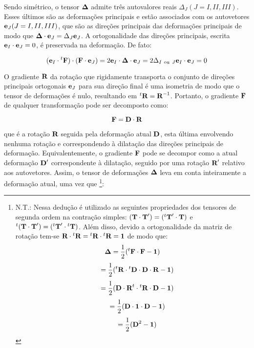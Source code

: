 \documentclass[
	11pt, %
	fleqn, %
	a4paper, %
]{LegrandOrangeBook}
\begin{document}
Sendo simétrico, o tensor $\bm{\Delta}$ admite três autovalores reais $\Delta_J (J=I,II,III)$. Esses últimos são as deformações principais e estão associados com os autovetores $\textbf{e}_J (J=I,II,III)$, que são as direções principais das deformações principais de modo que $\bm{\Delta} \cdot \textbf{e}_J = \Delta_J \textbf{e}_J$. A ortogonalidade das direções principais, escrita $\textbf{e}_I \cdot \textbf{e}_J = 0$, é preservada na deformação. De fato:

\begin{equation}
	\label{eq:eIFFeJ}	
	(\textbf{e}_I \cdot {}^t \textbf{F}) \cdot (\textbf{F} \cdot \textbf{e}_J) = 2\textbf{e}_I \cdot \bm{\Delta} \cdot \textbf{e}_J = 2 \Delta_{I~\text{ou}~J} \textbf{e}_I \cdot \textbf{e}_J = 0
\end{equation}

O gradiente $\textbf{R}$ da rotação que rigidamente transporta o conjunto de direções principais ortogonais $\textbf{e}_J$ para sua direção final é uma isometria de modo que o tensor de deformações é nulo, resultando em ${}^t\textbf{R} = \textbf{R}^{-1}$. Portanto, o gradiente $\textbf{F}$ de qualquer transformação pode ser decomposto como:

\begin{equation}
	\label{eq:F=DR}	
	\textbf{F} = \textbf{D} \cdot \textbf{R}
\end{equation}

que é a rotação $\textbf{R}$ seguida pela deformação atual $\textbf{D}$, esta última envolvendo nenhuma rotação e correspondendo à dilatação das direções principais de deformação. Equivalentemente, o gradiente $\textbf{F}$ pode se decompor como a atual deformação $\textbf{D}'$ correspondente à dilatação, seguido por uma rotação $\textbf{R}'$ relativo aos autovetores. Assim, o tensor de deformações $\bm{\Delta}$ leva em conta inteiramente a deformação atual, uma vez que \footnote{
N.T.: Nessa dedução é utilizado as seguintes propriedades dos tensores de segunda ordem na contração simples: $(\textbf{T} \cdot \textbf{T}') = ({}^t\textbf{T}' \cdot \textbf{T})$ e ${}^t(\textbf{T} \cdot \textbf{T}') =({}^t\textbf{T}' \cdot {}^t\textbf{T})$. Além disso, devido a ortogonalidade da matriz de rotação tem-se $\textbf{R} \cdot {}^t\textbf{R} = {}^t\textbf{R} \cdot {}^t\textbf{R} = \bm{1}$ de modo que:
\begin{displaymath}	
	\bm{\Delta} = \dfrac{1}{2}({}^t\textbf{F} \cdot \textbf{F} - \bm{1})
\end{displaymath}
\begin{displaymath}	
	~~~~ = \dfrac{1}{2}({}^t\textbf{R} \cdot {}^t\textbf{D} \cdot \textbf{D} \cdot \textbf{R} - \bm{1})
\end{displaymath}
\begin{displaymath}	
	~~~~ = \dfrac{1}{2}(\textbf{D} \cdot \textbf{R}^t \cdot {}^t\textbf{R} \cdot \textbf{D} - \bm{1})
\end{displaymath}
\begin{displaymath}	
	~~~~ = \dfrac{1}{2}(\textbf{D} \cdot \bm{1} \cdot \textbf{D} - \bm{1})
\end{displaymath}
\begin{displaymath}	
	~~~~ = \dfrac{1}{2}(\textbf{D}^2- \bm{1})
\end{displaymath}

}:
\end{document}
